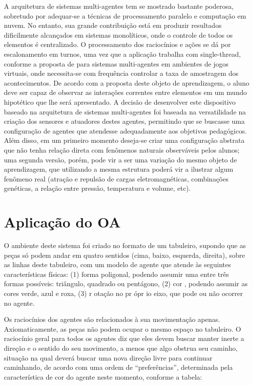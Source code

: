 \documentclass{article}
\begin{document}
A arquitetura de sistemas multi-agentes tem se mostrado bastante poderosa,
sobretudo por adequar-se a técnicas de processamento paralelo e computação em nuvem.
No entanto, sua grande contribuição está em produzir resultados dificilmente
alcançados em sistemas monolíticos, onde o controle de todos os elementos é
centralizado. O processamento dos raciocínios e ações se dá por escalonamento em
turnos, uma vez que a aplicação trabalha com single-thread, conforme a proposta de
\cite{behrens-2010} para sistemas multi-agentes em ambientes de jogos virtuais, onde necessita-se
com frequência controlar a taxa de amostragem dos acontecimentos.
De acordo com a proposta deste objeto de aprendizagem, o aluno deve ser capaz
de observar as interações correntes entre elementos em um mundo hipotético que lhe
será apresentado. A decisão de desenvolver este dispositivo baseado na arquitetura de
sistemas multi-agentes foi baseada na versatilidade na criação dos sensores e atuadores
destes agentes, permitindo que se buscasse uma configuração de agentes que atendesse
adequadamente aos objetivos pedagógicos. Além disso, em um primeiro momento
deseja-se criar uma configuração abstrata que não tenha relação direta com fenômenos
naturais observáveis pelos alunos; uma segunda versão, porém, pode vir a ser uma
variação do mesmo objeto de aprendizagem, que utilizando a mesma estrutura poderá
vir a ilustrar algum fenômeno real (atração e repulsão de cargas eletromagnéticas,
combinações genéticas, a relação entre pressão, temperatura e volume, etc).

\section{Aplicação do OA}

O ambiente deste sistema foi criado no formato de um tabuleiro, supondo que as peças
só podem andar em quatro sentidos (cima, baixo, esquerda, direita), sobre as linhas
deste tabuleiro, com um modelo de agente que atende às seguintes características
físicas: (1) forma poligonal, podendo assumir uma entre três formas possíveis:
triângulo, quadrado ou pentágono, (2) cor , podendo assumir as cores verde, azul e roxa,
(3) r otação no pr ópr io eixo, que pode ou não ocorrer no agente.

Os raciocínios dos agentes são relacionados à sua movimentação apenas.
Axiomaticamente, as peças não podem ocupar o mesmo espaço no tabuleiro. O
raciocínio geral para todos os agentes diz que eles devem buscar manter inerte a direção
e o sentido do seu movimento, a menos que algo obstrua seu caminho, situação na qual
deverá buscar uma nova direção livre para continuar caminhando, de acordo com uma
ordem de “preferências”, determinada pela característica de cor do agente neste
momento, conforme a tabela:
\end{document}
